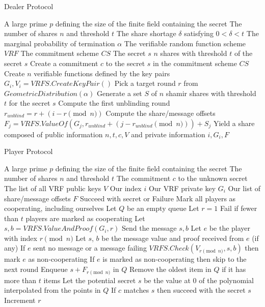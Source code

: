 \documentclass{dalcsthesis}
\begin{document}
\begin{algorithm}
  \caption{Dealer Protocol}
  \label{alg:ABC_Dealer}
  \begin{algorithmic}
    \INPUT A large prime $p$ defining the size of the finite field containing the secret
    \INPUT The number of shares $n$ and threshold $t$
    \INPUT The share shortage $\delta$ satisfying $0 < \delta < t$
    \INPUT The marginal probability of termination $\alpha$
    \INPUT The verifiable random function scheme $VRF$
    \INPUT The commitment scheme $CS$
    \INPUT The secret $s$
    \OUTPUT $n$ shares with threshold $t$ of the secret $s$
    \STATE Create a commitment $c$ to the secret $s$ in the commitment scheme $CS$
    \STATE Create $n$ verifiable functions defined by the key pairs $G_i, V_i = VRFS.CreateKeyPair()$
    \STATE Pick a target round $r$ from $GeometricDistribution(\alpha)$
      \STATE Generate a set $S$ of $n$ shamir shares with threshold $t$ for the secret $s$
      \STATE Compute the first unblinding round $r_{unblind} = r + (i-r \pmod{n})$
      \STATE Compute the share/message offsets $F_j = VRFS.ValueOf(G_j, r_{unblind} + (j-r_{unblind} \pmod{n})) + S_j$
      \STATE Yield a share composed of public information $n, t, c, V$ and private information $i, G_i, F$
    \ENDFOR
  \end{algorithmic}
\end{algorithm}
\begin{algorithm}
  \caption{Player Protocol}
  \label{alg:ABC_Player}
  \begin{algorithmic}
    \INPUT A large prime $p$ defining the size of the finite field containing the secret
    \INPUT The number of shares $n$ and threshold $t$
    \INPUT The commitment $c$ to the unknown secret
    \INPUT The list of all VRF public keys $V$
    \INPUT Our index $i$
    \INPUT Our VRF private key $G_i$
    \INPUT Our list of share/message offsets $F$
    \OUTPUT Succeed with secret or Failure
    \STATE Mark all players as cooperating, including ourselves
    \STATE Let $Q$ be an empty queue
    \STATE Let $r = 1$
	  \STATE Fail if fewer than $t$ players are marked as cooperating
	  	 \STATE Let $s, b = VRFS.ValueAndProof(G_i, r)$ 
	  	 \STATE Send the message $s, b$
	  \ELSE
	     \STATE Let $e$ be the player with index $r \pmod{n}$
	     \STATE Let $s$, $b$ be the message value and proof received from $e$ (if any)
	     \STATE If $e$ sent no message or a message failing $VRFS.Check(V_{r \pmod{n}}, s, b)$ then mark $e$ as non-cooperating
	     \STATE If $e$ is marked as non-cooperating then skip to the next round
	   \ENDIF
	   \STATE Enqueue $s+F_{r \pmod{n}}$ in $Q$
       \STATE Remove the oldest item in $Q$ if it has more than $t$ items
	   \STATE Let the potential secret $s$ be the value at 0 of the polynomial interpolated from the points in $Q$
	   \STATE If $c$ matches $s$ then succeed with the secret $s$
       \STATE Increment $r$
	\ENDWHILE
  \end{algorithmic}
\end{algorithm}
\end{document}
